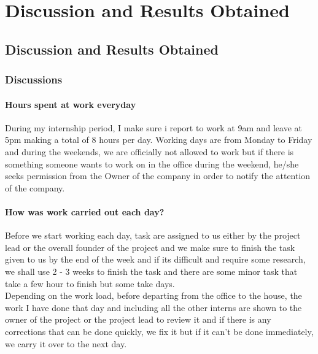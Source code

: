 
\chapter{Discussion and Results Obtained} %

\label{Chapter4} %


\section{Discussion and Results Obtained}

\subsection{Discussions}

\subsubsection{Hours spent at work everyday}

During my internship period, I make sure i report to work at 9am and leave at 5pm making a total of 8 hours per day. Working days are from Monday to Friday and during the weekends, we are officially not allowed to work but if there is something someone wants to work on in the office during the weekend, he/she seeks permission from the Owner of the company in order to notify the attention of the company.

\subsubsection{How was work carried out each day?}

Before we start working each day, task are assigned to us either by the project lead or the overall founder of the project and we make sure to finish the task given to us by the end of the week and if its difficult and require some research, we shall use 2 - 3 weeks to finish the task and there are some minor task that take a few hour to finish but some take days. \\

Depending on the work load, before departing from the office to the house, the work I have done that day and including all the other interns are shown to the owner of the project or the project lead to review it and if there is any corrections that can be done quickly, we fix it but if it can't be done immediately, we carry it over to the next day. \\

